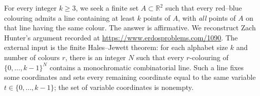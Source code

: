 For every integer $k\ge3$, we seek a finite set $A\subset\mathbb R^2$ such that every red--blue colouring admits a line containing at least $k$ points of $A$, with \emph{all} points of $A$ on that line having the same colour.
The answer is affirmative. We reconstruct Zach Hunter's argument recorded at \url{https://www.erdosproblems.com/1090}. The external input is the finite Hales--Jewett theorem: for each alphabet size $k$ and number of colours $r$, there is an integer $N$ such that every $r$-colouring of $\{0,\ldots,k-1\}^N$ contains a monochromatic combinatorial line. Such a line fixes some coordinates and sets every remaining coordinate equal to the same variable $t\in\{0,\ldots,k-1\}$; the set of variable coordinates is nonempty.
